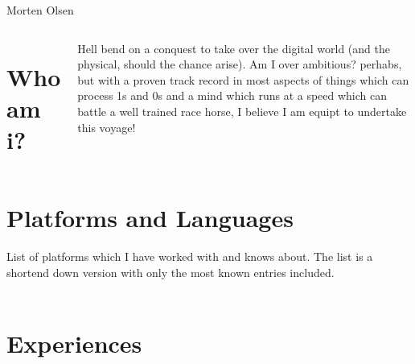 \begin{cvtitle}{Morten Olsen}
\end{cvtitle}

\begin{columns}
	\section*{Who am i?}
	Hell bend on a conquest to take over the digital world (and the physical, should the chance arise). Am I over ambitious? perhabs, but with a proven track record in most aspects of things which can process 1s and 0s and a mind which runs at a speed which can battle a well trained race horse, I believe I am equipt to undertake this voyage!
\end{columns}

\section*{Platforms and Languages}
	List of platforms which I have worked with and knows about. The list is a shortend down version with only the most known entries included.\\\\
\begin{cvskills}
\end{cvskills}

\section*{Experiences}

